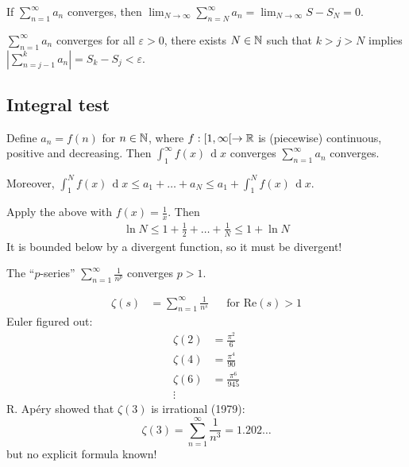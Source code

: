 \documentclass[12pt]{article}
\renewcommand{\d}{\ensuremath{\operatorname{d}}}
\begin{document}
\begin{theorem}
    If $\sum_{n=1}^{\infty}a_n$ converges, then $\lim_{N\to \infty}\sum_{n=N}^{\infty}a_n=\lim_{N\to \infty}S-S_N=0$.
\end{theorem}

\begin{theorem}
    $\sum_{n=1}^{\infty}a_n$ converges \ifnif for all $\varepsilon>0$, there exists $N\in \mathbb{N}$ such that $k>j>N$ implies $\displaystyle \left|\sum_{n=j-1}^{k}a_n \right|=S_k-S_j<\varepsilon$.
\end{theorem}

\subsection{Integral test}

 Define $a_n=f(n)$ for $n\in \mathbb{N}$, where $f:[1,\infty[ \to \mathbb{R}$ is (piecewise) continuous, positive and decreasing. Then $\int_{1}^{\infty}f(x)\, \d x$ converges \ifnif $\sum_{n=1}^{\infty}a_n$ converges.

Moreover, $\int_{1}^{N}f(x)\,\d x\leq a_1+\dots+a_N\leq a_1+\int_{1}^{N}f(x)\,\d x$.

\eg Apply the above with $f(x)=\frac{1}{x}$. Then \begin{align*}
    \ln N\leq 1+\frac{1}{2}+\dots+\frac{1}{N}\leq 1+\ln N
\end{align*}
It is bounded below by a divergent function, so it must be divergent!

\begin{theorem}
    The ``$p$-series'' $\sum_{n=1}^{\infty}\frac{1}{n^p}$ converges \ifnif $p>1$.
\end{theorem}

 \begin{align*}
    \zeta(s)&=\sum_{n=1}^{\infty}\frac{1}{n^s} && \text{for Re}(s)>1
\end{align*}
\rmk Euler figured out: \begin{align*}
    \zeta(2)&=\frac{\pi^2}{6}\\
    \zeta(4)&=\frac{\pi^4}{90}\\
    \zeta(6)&=\frac{\pi^6}{945}\\
    \vdots
\end{align*}
\rmk R. Apéry showed that $\zeta(3)$ is irrational (1979):
\[\zeta(3)=\sum_{n=1}^{\infty}\frac{1}{n^3}=1.202\dots\]
but no explicit formula known!
\end{document}

